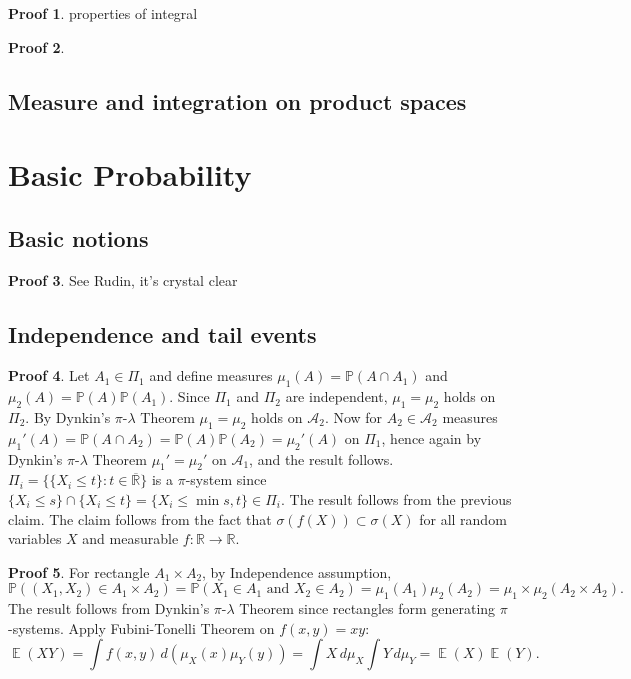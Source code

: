 \documentclass[hidelinks,11pt]{article}
\theoremstyle{definition}
\theoremstyle{dotless}
\newtheorem{prop}{Proof}[section]
\theoremstyle{remark}
\DeclareMathOperator{\E}{\mathbb{E}}
\DeclareMathOperator{\1}{\mathbf{1}}
\begin{document}
\begin{prop}
properties of integral
\end{prop}

\begin{prop}

\end{prop}

\subsection{Measure and integration on product spaces}

\section{Basic Probability}

\subsection{Basic notions}

\begin{prop}
See Rudin, it's crystal clear
\end{prop}

\subsection{Independence and tail events}

\begin{prop}
Let $A_1\in\Pi_1$ and define measures $\mu_1(A)=\mathbb{P}(A\cap A_1)$ and $\mu_2(A)=\mathbb{P}(A)\mathbb{P}(A_1)$. Since $\Pi_1$ and $\Pi_2$ are independent, $\mu_1=\mu_2$ holds on $\Pi_2$. By Dynkin's $\pi$-$\lambda$ Theorem $\mu_1=\mu_2$ holds on $\mathcal{A}_2$. Now for $A_2\in\mathcal{A}_2$ measures $\mu_1'(A)=\mathbb{P}(A\cap A_2)=\mathbb{P}(A)\mathbb{P}(A_2)=\mu_2'(A)$ on $\Pi_1$, hence again by Dynkin's $\pi$-$\lambda$ Theorem $\mu_1'=\mu_2'$ on $\mathcal{A}_1$, and the result follows.\medbreak
$\Pi_i=\{\{X_i\leq t\}:t\in\overline{\mathbb{R}}\}$ is a $\pi$-system since $\{X_i\leq s\}\cap\{X_i\leq t\}=\{X_i\leq\min{s,t}\}\in\Pi_i$. The result follows from the previous claim.\medbreak
The claim follows from the fact that $\sigma(f(X))\subset\sigma(X)$ for all random variables $X$ and measurable $f:\mathbb{R}\to\mathbb{R}$.
\end{prop}

\begin{prop}
For rectangle $A_1\times A_2$, by Independence assumption,
\[\mathbb{P}((X_1,X_2)\in A_1\times A_2)=\mathbb{P}(X_1\in A_1\textrm{ and }X_2\in A_2)=\mu_1(A_1)\mu_2(A_2)=\mu_1\times\mu_2(A_2\times A_2).\]
The result follows from Dynkin's $\pi$-$\lambda$ Theorem since rectangles form generating $\pi$-systems.\medbreak
Apply Fubini-Tonelli Theorem on $f(x,y)=xy$:
\[\E(XY)=\int f(x,y)\,d(\mu_X(x)\mu_Y(y))=\int X\,d\mu_X\int Y\,d\mu_Y=\E(X)\E(Y).\]
\end{prop}
\end{document}
